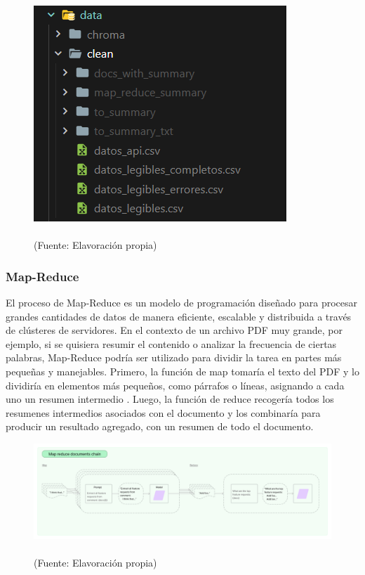  \begin{figure}[ht!]
    \centering
    \includegraphics[width=.5\textwidth]{figures/huemulFOLDERS.png}
    \caption[]{\\
    {\scriptsize (Fuente: Elavoración propia)}}
    \label{fig:chatbot1}
\end{figure}

\subsubsection{Map-Reduce}


\par El proceso de Map-Reduce es un modelo de programación diseñado para procesar grandes cantidades de datos de manera eficiente, 
escalable y distribuida a través de clústeres de servidores. En el contexto de un archivo PDF muy grande, por ejemplo, si se quisiera resumir 
el contenido o analizar la frecuencia de ciertas palabras, Map-Reduce podría ser utilizado para dividir la tarea en partes más pequeñas y manejables. 
Primero, la función de map tomaría el texto del PDF y lo dividiría en elementos más pequeños, como párrafos o líneas, 
asignando a cada uno un resumen intermedio \cite{mapreduce}. Luego, la función de reduce recogería todos los resumenes intermedios asociados con el documento 
y los combinaría para producir un resultado agregado, con un resumen de todo el documento. 


\begin{figure}[ht!]
    \centering
    \includegraphics[width=.9\textwidth]{figures/huemul_mapreduce.jpg}
    \caption[]{\\
    {\scriptsize (Fuente: Elavoración propia)}}
    \label{fig:chatbot1}
\end{figure}

